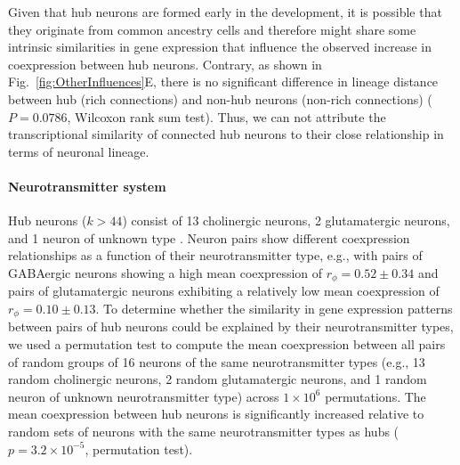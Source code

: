 \documentclass[10pt,letterpaper]{article}
\begin{document}
Given that hub neurons are formed early in the development, it is possible that they originate from common ancestry cells and therefore might share some intrinsic similarities in gene expression that influence the observed increase in coexpression between hub neurons.
Contrary, as shown in Fig.~\ref{fig:OtherInfluences}E, there is no significant difference in lineage distance between hub (rich connections) and non-hub neurons (non-rich connections) ($P = 0.0786$, Wilcoxon rank sum test).
Thus, we can not attribute the transcriptional similarity of connected hub neurons to their close relationship in terms of neuronal lineage.





\paragraph{Neurotransmitter system}
Hub neurons ($k > 44$) consist of 13 cholinergic neurons, 2 glutamatergic neurons, and 1 neuron of unknown type \cite{Pereira:2015er}.
Neuron pairs show different coexpression relationships as a function of their neurotransmitter type, e.g., with pairs of GABAergic neurons showing a high mean coexpression of $r_\phi = 0.52 \pm 0.34$ and pairs of glutamatergic neurons exhibiting a relatively low mean coexpression of $r_\phi = 0.10 \pm 0.13$.
To determine whether the similarity in gene expression patterns between pairs of hub neurons could be explained by their neurotransmitter types, we used a permutation test to compute the mean coexpression between all pairs of random groups of 16 neurons of the same neurotransmitter types (e.g., 13 random cholinergic neurons, 2 random glutamatergic neurons, and 1 random neuron of unknown neurotransmitter type) across $1\times 10^6$ permutations.
The mean coexpression between hub neurons is significantly increased relative to random sets of neurons with the same neurotransmitter types as hubs ($p = 3.2\times 10^{-5}$, permutation test).
\end{document}
